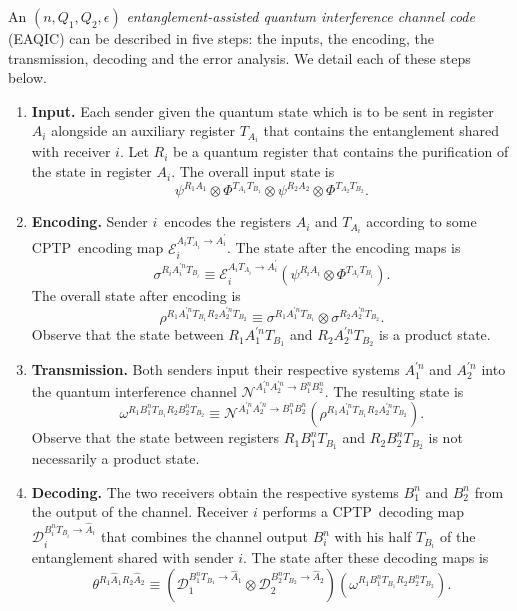 \documentclass[aps,11pt,twoside,letterpaper]{article}
\begin{document}
		An $(n,Q_{1},Q_{2},\epsilon)$ \textit{entanglement-assisted quantum
		interference channel code} (EAQIC) can be described in five steps: the inputs,
		the encoding, the transmission, decoding and the error analysis.
		We detail each of these steps below.
		
		\begin{enumerate}

		\item {\bf Input.} 
		Each sender given the quantum state which is to be sent in register
		$A_{i}$ alongside an auxiliary register $T_{A_{i}}$ that contains the entanglement shared
		with receiver $i$. Let $R_{i}$ be a quantum register that contains the
		purification of the state in register $A_{i}$. The overall input state is%
		\[
		\psi^{R_{1}A_{1}}\otimes\Phi^{T_{A_{1}}T_{B_{1}}}\otimes\psi^{R_{2}A_{2}%
		}\otimes\Phi^{T_{A_{2}}T_{B_{2}}}.
		\]

		\item \textbf{Encoding.} 
		Sender $i$\ encodes the registers $A_{i}$ and
		$T_{A_{i}}$ according to some CPTP\ encoding map $\mathcal{E}_{i}%
		^{A_{i}T_{A_{i}}\rightarrow A_{i}^{\prime}}$. The state after the encoding
		maps is%
		\[
		\sigma^{R_{i}A_{i}^{\prime n}T_{B_{i}}}\equiv\mathcal{E}_{i}^{A_{i}T_{A_{i}%
		}\rightarrow A_{i}^{\prime}}(\psi^{R_{i}A_{i}}\otimes\Phi^{T_{A_{i}}T_{B_{i}}%
		}).
		\]
		The overall state after encoding is%
		\[
		\rho^{R_{1}A_{1}^{\prime n}T_{B_{1}}R_{2}A_{2}^{\prime n}T_{B_{2}}}%
		\equiv\sigma^{R_{1}A_{1}^{\prime n}T_{B_{1}}}\otimes\sigma^{R_{2}A_{2}^{\prime
		n}T_{B_{2}}}.
		\]
		Observe that the state between $R_{1}A_{1}^{\prime n}T_{B_{1}}$ and
		$R_{2}A_{2}^{\prime n}T_{B_{2}}$ is a product state.

		\item \textbf{Transmission.} 
		Both senders input their respective systems
		$A_{1}^{\prime n}$ and $A_{2}^{\prime n}$ into the quantum
		interference channel $\mathcal{N}^{A_{1}^{\prime n}A_{2}^{\prime n}\rightarrow
		B_{1}^{n}B_{2}^{n}}$. The resulting state is%
		\[
		\omega^{R_{1}B_{1}^{n}T_{B_{1}}R_{2}B_{2}^{n}T_{B_{2}}}\equiv\mathcal{N}%
		^{A_{1}^{\prime n}A_{2}^{\prime n}\rightarrow B_{1}^{n}B_{2}^{n}}(\rho
		^{R_{1}A_{1}^{\prime n}T_{B_{1}}R_{2}A_{2}^{\prime n}T_{B_{2}}}).
		\]
		Observe that the state between registers $R_{1}B_{1}^{n}T_{B_{1}}$ and
		$R_{2}B_{2}^{n}T_{B_{2}}$ is not necessarily a product state.

		\item \textbf{Decoding.} The two receivers obtain the respective systems
		$B_{1}^{n}$ and $B_{2}^{n}$ from the output of the channel. Receiver $i$
		performs a CPTP\ decoding map $\mathcal{D}_{i}^{B_{i}^{n}T_{B_{i}}%
		\rightarrow\hat{A}_{i}}$ that combines the channel output $B_{i}^{n}$ with his
		half $T_{B_{i}}$ of the entanglement shared with sender $i$. The state after
		these decoding maps is%
		\[
		\theta^{R_{1}\hat{A}_{1}R_{2}\hat{A}_{2}}\equiv(\mathcal{D}_{1}^{B_{1}%
		^{n}T_{B_{1}}\rightarrow\hat{A}_{1}}\otimes\mathcal{D}_{2}^{B_{2}^{n}T_{B_{2}%
		}\rightarrow\hat{A}_{2}})(\omega^{R_{1}B_{1}^{n}T_{B_{1}}R_{2}B_{2}%
		^{n}T_{B_{2}}}).
		\]
		

\end{enumerate}
\end{document}

